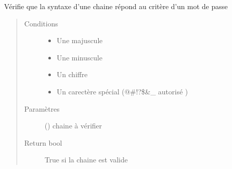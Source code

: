 \documentclass[letterpaper,10pt,french]{sphinxmanual}
\begin{document}
\begin{fulllineitems}
\label{\detokenize{modules/tools:toolbox.tools.check_password}}
Vérifie que la syntaxe d’une chaine répond au critère d’un mot de passe
\begin{quote}\begin{description}
\item[{Conditions}] \leavevmode\begin{itemize}
\item {} 
Une majuscule

\item {} 
Une minuscule

\item {} 
Un chiffre

\item {} 
Un carectère spécial (@\#!?\$\&\sphinxhyphen{}\_ autorisé )

\end{itemize}

\item[{Paramètres}] \leavevmode
{} () \textendash{} chaine à vérifier

\item[{Return bool}] \leavevmode
True si la chaine est valide

\end{description}\end{quote}

\end{fulllineitems}

\end{document}
